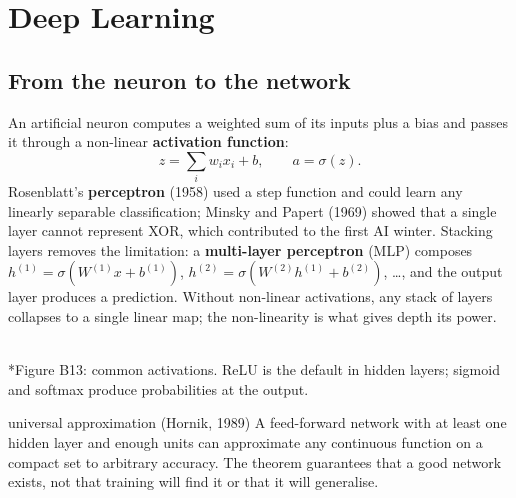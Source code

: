 \documentclass[11pt]{article}
\begin{document}
\section{Deep Learning}
\label{sec:dl}
\subsection{From the neuron to the network}
An artificial neuron computes a weighted sum of its inputs plus a bias and passes it through a non-linear \textbf{activation function}:
\[z=\sum_iw_ix_i+b,\qquad a=\sigma(z).\]
Rosenblatt's \textbf{perceptron} (1958) used a step function and could learn any linearly separable classification; Minsky and Papert (1969) showed that a single layer cannot represent XOR, which contributed to the first AI winter. Stacking layers removes the limitation: a \textbf{multi-layer perceptron} (MLP) composes $h^{(1)}=\sigma(W^{(1)}x+b^{(1)})$, $h^{(2)}=\sigma(W^{(2)}h^{(1)}+b^{(2)})$, \ldots, and the output layer produces a prediction. Without non-linear activations, any stack of layers collapses to a single linear map; the non-linearity is what gives depth its power.
\begin{center}\\*{\small\color{GreyN}Figure B13: common activations. ReLU is the default in hidden layers; sigmoid and softmax produce probabilities at the output.}\end{center}
\begin{definition}{universal approximation (Hornik, 1989)}
A feed-forward network with at least one hidden layer and enough units can approximate any continuous function on a compact set to arbitrary accuracy. The theorem guarantees that a good network exists, not that training will find it or that it will generalise.
\end{definition}
\end{document}
